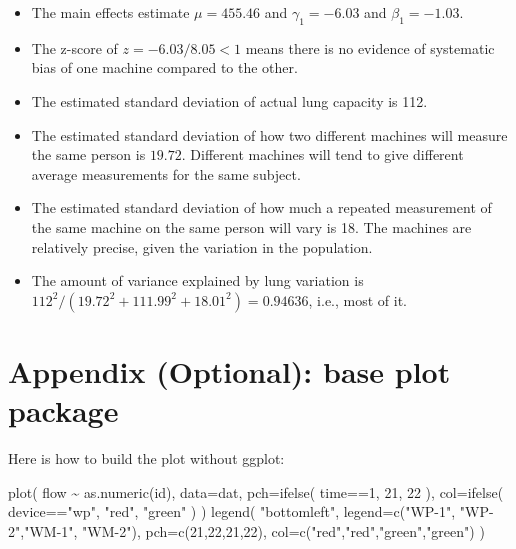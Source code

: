 \documentclass[
  letterpaper,
  DIV=11,
  numbers=noendperiod]{scrreprt}
\newenvironment{Shaded}{\begin{snugshade}}{\end{snugshade}}
\newcommand{\AttributeTok}[1]{\textcolor[rgb]{0.49,0.56,0.16}{#1}}
\newcommand{\DecValTok}[1]{\textcolor[rgb]{0.25,0.63,0.44}{#1}}
\newcommand{\FunctionTok}[1]{\textcolor[rgb]{0.02,0.16,0.49}{#1}}
\newcommand{\NormalTok}[1]{\textcolor[rgb]{0.00,0.44,0.13}{#1}}
\newcommand{\SpecialCharTok}[1]{\textcolor[rgb]{0.25,0.44,0.63}{#1}}
\newcommand{\StringTok}[1]{\textcolor[rgb]{0.25,0.44,0.63}{#1}}
\providecommand{\tightlist}{%
  \setlength{\itemsep}{0pt}\setlength{\parskip}{0pt}}\usepackage{longtable,booktabs,array}
\begin{document}
\begin{itemize}
\tightlist
\item
  The main effects estimate \(\mu = 455.46\) and \(\gamma_1 = -6.03\)
  and \(\beta_1 = -1.03\).
\item
  The z-score of \(z = -6.03 / 8.05 < 1\) means there is no evidence of
  systematic bias of one machine compared to the other.
\item
  The estimated standard deviation of actual lung capacity is 112.
\item
  The estimated standard deviation of how two different machines will
  measure the same person is \(19.72\). Different machines will tend to
  give different average measurements for the same subject.
\item
  The estimated standard deviation of how much a repeated measurement of
  the same machine on the same person will vary is 18. The machines are
  relatively precise, given the variation in the population.
\item
  The amount of variance explained by lung variation is
  \(112^2 / (19.72^2 + 111.99^2 + 18.01^2) = 0.94636\), i.e., most of
  it.
\end{itemize}

\hypertarget{appendix-optional-base-plot-package}{%
\section{Appendix (Optional): base plot
package}\label{appendix-optional-base-plot-package}}

Here is how to build the plot without ggplot:

\begin{Shaded}
\begin{Highlighting}[]
\FunctionTok{plot}\NormalTok{( flow }\SpecialCharTok{\textasciitilde{}} \FunctionTok{as.numeric}\NormalTok{(id), }\AttributeTok{data=}\NormalTok{dat, }\AttributeTok{pch=}\FunctionTok{ifelse}\NormalTok{( time}\SpecialCharTok{==}\DecValTok{1}\NormalTok{, }\DecValTok{21}\NormalTok{, }\DecValTok{22}\NormalTok{ ),}
      \AttributeTok{col=}\FunctionTok{ifelse}\NormalTok{( device}\SpecialCharTok{==}\StringTok{"wp"}\NormalTok{, }\StringTok{"red"}\NormalTok{, }\StringTok{"green"}\NormalTok{ ) )}
\FunctionTok{legend}\NormalTok{( }\StringTok{"bottomleft"}\NormalTok{, }\AttributeTok{legend=}\FunctionTok{c}\NormalTok{(}\StringTok{"WP{-}1"}\NormalTok{, }\StringTok{"WP{-}2"}\NormalTok{,}\StringTok{"WM{-}1"}\NormalTok{, }\StringTok{"WM{-}2"}\NormalTok{),}
        \AttributeTok{pch=}\FunctionTok{c}\NormalTok{(}\DecValTok{21}\NormalTok{,}\DecValTok{22}\NormalTok{,}\DecValTok{21}\NormalTok{,}\DecValTok{22}\NormalTok{),}
        \AttributeTok{col=}\FunctionTok{c}\NormalTok{(}\StringTok{"red"}\NormalTok{,}\StringTok{"red"}\NormalTok{,}\StringTok{"green"}\NormalTok{,}\StringTok{"green"}\NormalTok{) )}
\end{Highlighting}
\end{Shaded}
\end{document}
